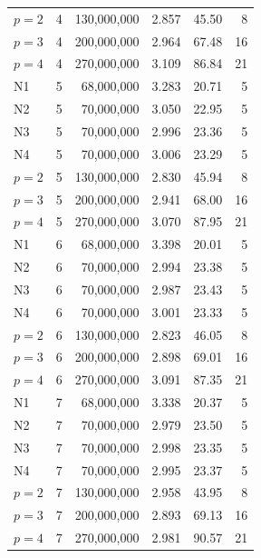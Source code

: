 \documentclass[conference,10pt]{IEEEtran}
\begin{document}
\begin{table}[h]
\begin{tabular}{@{}lrrrrr@{}}
$p{=}2$ & 4 & 130,000,000 & 2.857 & 45.50 & 8 \\
$p{=}3$ & 4 & 200,000,000 & 2.964 & 67.48 & 16 \\
$p{=}4$ & 4 & 270,000,000 & 3.109 & 86.84 & 21 \\
N1 & 5 & 68,000,000 & 3.283 & 20.71 & 5 \\
N2 & 5 & 70,000,000 & 3.050 & 22.95 & 5 \\
N3 & 5 & 70,000,000 & 2.996 & 23.36 & 5 \\
N4 & 5 & 70,000,000 & 3.006 & 23.29 & 5 \\
$p{=}2$ & 5 & 130,000,000 & 2.830 & 45.94 & 8 \\
$p{=}3$ & 5 & 200,000,000 & 2.941 & 68.00 & 16 \\
$p{=}4$ & 5 & 270,000,000 & 3.070 & 87.95 & 21 \\
N1 & 6 & 68,000,000 & 3.398 & 20.01 & 5 \\
N2 & 6 & 70,000,000 & 2.994 & 23.38 & 5 \\
N3 & 6 & 70,000,000 & 2.987 & 23.43 & 5 \\
N4 & 6 & 70,000,000 & 3.001 & 23.33 & 5 \\
$p{=}2$ & 6 & 130,000,000 & 2.823 & 46.05 & 8 \\
$p{=}3$ & 6 & 200,000,000 & 2.898 & 69.01 & 16 \\
$p{=}4$ & 6 & 270,000,000 & 3.091 & 87.35 & 21 \\
N1 & 7 & 68,000,000 & 3.338 & 20.37 & 5 \\
N2 & 7 & 70,000,000 & 2.979 & 23.50 & 5 \\
N3 & 7 & 70,000,000 & 2.998 & 23.35 & 5 \\
N4 & 7 & 70,000,000 & 2.995 & 23.37 & 5 \\
$p{=}2$ & 7 & 130,000,000 & 2.958 & 43.95 & 8 \\
$p{=}3$ & 7 & 200,000,000 & 2.893 & 69.13 & 16 \\
$p{=}4$ & 7 & 270,000,000 & 2.981 & 90.57 & 21 \\
\bottomrule
\end{tabular}
\end{table}
\end{document}
